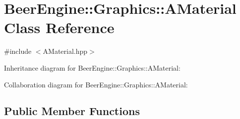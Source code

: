 \hypertarget{class_beer_engine_1_1_graphics_1_1_a_material}{}\section{Beer\+Engine\+:\+:Graphics\+:\+:A\+Material Class Reference}
\label{class_beer_engine_1_1_graphics_1_1_a_material}


{\ttfamily \#include $<$A\+Material.\+hpp$>$}



Inheritance diagram for Beer\+Engine\+:\+:Graphics\+:\+:A\+Material\+:


Collaboration diagram for Beer\+Engine\+:\+:Graphics\+:\+:A\+Material\+:
\subsection*{Public Member Functions}
